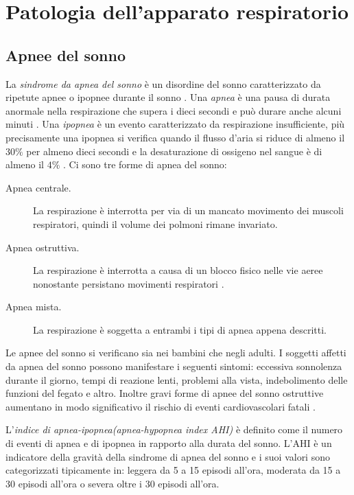 \section{Patologia dell'apparato respiratorio}

\subsection{Apnee del sonno}
La \emph{sindrome da apnea del sonno} \`e un disordine del sonno caratterizzato da ripetute apnee o ipopnee durante il sonno \cite{ASDBOS}. 
Una \emph{apnea} \`e una pausa di durata anormale nella respirazione che supera i dieci secondi \cite{OSARFSD} e pu\`o durare anche alcuni minuti \cite{NHLBI}. 
Una \emph{ipopnea} \`e un evento caratterizzato da respirazione insufficiente, pi\`u precisamente una ipopnea si verifica quando il flusso d'aria si riduce di almeno il $30\%$ per almeno dieci secondi e la desaturazione di ossigeno nel sangue \`e di almeno il $4\%$ \cite{OSARFSD}. 
Ci sono tre forme di apnea del sonno:
\begin{description}
  \item[Apnea centrale.]
   La respirazione \`e interrotta per via di un mancato movimento dei muscoli respiratori, quindi il volume dei polmoni rimane invariato.
  \item[Apnea ostruttiva.]
    La respirazione \`e interrotta a causa di un blocco fisico nelle vie aeree nonostante persistano movimenti respiratori \cite{AntoniettaBisulli}.
  \item[Apnea mista.]
    La respirazione \`e soggetta a entrambi i tipi di apnea appena descritti.
\end{description}

Le apnee del sonno si verificano sia nei bambini che negli adulti. I soggetti affetti da apnea del sonno possono manifestare i seguenti sintomi: eccessiva sonnolenza durante il giorno, tempi di reazione lenti, problemi alla vista, indebolimento delle funzioni del fegato e altro. 
Inoltre gravi forme di apnee del sonno ostruttive aumentano in modo significativo il rischio di eventi cardiovascolari fatali \cite{OSARFSD, ASAHAIS, SSAAROISITE}.

L'\emph{indice di apnea-ipopnea(apnea-hypopnea index AHI)} \`e definito come il numero di eventi di apnea e di ipopnea in rapporto alla durata del sonno. 
L'AHI \`e un indicatore della gravit\`a della sindrome di apnea del sonno e i suoi valori sono categorizzati tipicamente in: leggera da 5 a 15 episodi all'ora, moderata da 15 a 30 episodi all'ora o severa oltre i 30 episodi all'ora. 

